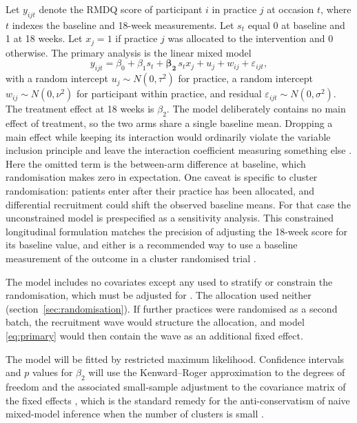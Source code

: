 \documentclass[11pt,a4paper]{article}
\begin{document}
Let $y_{ijt}$ denote the RMDQ score of participant $i$ in practice $j$ at
occasion $t$, where $t$ indexes the baseline and 18-week measurements. Let
$s_t$ equal 0 at baseline and 1 at 18 weeks. Let $x_j = 1$ if practice $j$
was allocated to the intervention and $0$ otherwise. The primary analysis
is the linear mixed model
\begin{equation}
\label{eq:primary}
y_{ijt} = \beta_0 + \beta_1 s_t + \boldsymbol{\beta_2}\, s_t x_j + u_j + w_{ij} + \varepsilon_{ijt},
\end{equation}
with a random intercept $u_j \sim N(0,\tau^2)$ for practice, a random
intercept $w_{ij} \sim N(0,\nu^2)$ for participant within practice, and
residual $\varepsilon_{ijt} \sim N(0,\sigma^2)$. The treatment effect at 18
weeks is $\beta_2$. The model deliberately contains no main effect of
treatment, so the two arms share a single baseline mean. Dropping a main
effect while keeping its interaction would ordinarily violate the variable
inclusion principle and leave the interaction coefficient measuring something
else \citep{westfall2020}. Here the omitted term is the between-arm
difference at baseline, which randomisation makes zero in expectation. One
caveat is specific to cluster randomisation: patients enter after their
practice has been allocated, and differential recruitment could shift the
observed baseline means. For that case the unconstrained model is
prespecified as a sensitivity analysis. This constrained longitudinal formulation
\citep{liang2000} matches the precision of adjusting the 18-week score for
its baseline value, and either is a recommended way to use a baseline
measurement of the outcome in a cluster randomised trial \citep{hooper2018}.

The model includes no covariates except any used to stratify or constrain the
randomisation, which must be adjusted for \citep{kahan2012, hemming2023}.
The allocation used neither (section~\ref{sec:randomisation}). If further
practices were randomised as a second batch, the recruitment wave would
structure the allocation, and model \eqref{eq:primary} would then contain the
wave as an additional fixed effect.

The model will be fitted by restricted maximum likelihood. Confidence intervals
and $p$ values for $\beta_2$ will use the Kenward--Roger approximation to the
degrees of freedom and the associated small-sample adjustment to the covariance
matrix of the fixed effects \citep{kenward1997}, which is the standard remedy
for the anti-conservatism of naive mixed-model inference when the number of
clusters is small \citep{leyrat2018, kahan2016}.
\end{document}
